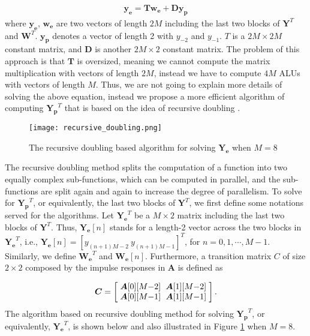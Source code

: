 \begin{equation*}
    \begin{aligned}
        \bm{y_e} = \bm{T} \bm{w_e} + \bm{D}\bm{y_p}
    \end{aligned}
\end{equation*}
where $\bm{y_e}$, $\bm{w_e}$ are two vectors of length $2M$ including the last two blocks of $\bm{Y}^T$ and $\bm{W}^T$.
$\bm{y_p}$ denotes a vector of length 2 with $y_{-2}$ and $y_{-1}$.
$T$ is a $2M \times 2M$ constant matrix, and $\bm{D}$ is another $2M \times 2$ constant matrix.
The problem of this approach is that $\bm{T}$ is oversized, meaning we cannot compute the matrix multiplication 
with vectors of length $2M$, instead we have to compute $4M$ ALUs with vectors of length $M$.
Thus, we are not going to explain more details of solving the above equation, instead we propose a more efficient algorithm
of computing $\bm{Y_p}^T$ that is based on the idea of recursive doubling \cite{Kogge_73}.  


\begin{figure}[t]
    \centerline{\texttt{[image: recursive\_doubling.png]}}
    \caption{The recursive doubling based algorithm for solving $\bm{Y_e}$ when $M{=}8$}
    \label{fig:Recursive_doubling_for_Ye}
  \end{figure}


The recursive doubling method splits the computation of a function into two equally complex sub-functions, which can be computed in parallel,
and the sub-functions are split again and again to increase the degree of parallelism. 
To solve for $\bm{Y_p}^T$, or equivalently, the last two blocks of $\bm{Y}^T$,
we first define some notations served for the algorithms. Let $\bm{Y_e}^T$ be a $M \times 2$ matrix including
the last two blocks of $\bm{Y}^T$. Thus, $\bm{Y_e}[n]$ stands for a length-2 vector across the two blocks in $\bm{Y_e}^T$, i.e.,
$\bm{Y_e}[n] = \left[y_{(n+1)M-2} ~ y_{(n+1)M-1}\right]^T$, for $n=0,1,\cdots,M{-}1$.
Similarly, we define $\bm{W_e}^T$ and $\bm{W_e}[n]$.
Furthermore, a transition matrix $C$ of size $2 \times 2$ composed by the impulse responses in $\bm{A}$ is defined as

\begin{equation*}
        \bm{C} = \left[\arraycolsep=3.0pt\def\arraystretch{1.0}
            \begin{array}{cc}
            \bm{A}[0][M{-}2] & \bm{A}[1][M{-}2] \\ 
            \bm{A}[0][M{-}1] & \bm{A}[1][M{-}1] \\ 
            \end{array}\right].
\end{equation*}
The algorithm based on recursive doubling method for solving $\bm{Y_p}^T$, or equivalently, $\bm{Y_e}^T$, is shown below
and also illustrated in Figure \ref{fig:Recursive_doubling_for_Ye} when $M=8$.

